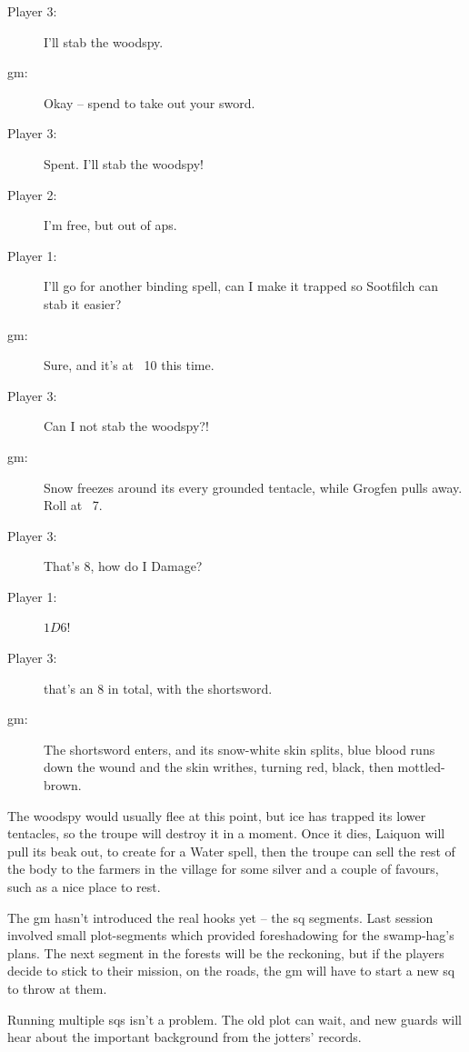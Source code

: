 \begin{multicols}{3}
\begin{description}
  \item[Player 3:]
  I'll stab the \gls{woodspy}.
  \item[\gls{gm}:]
  Okay -- spend  to take out your sword.
  \item[Player 3:]
  Spent.
  I'll stab the \gls{woodspy}!
  \item[Player 2:]
  I'm free, but out of \glspl{ap}.
  \item[Player 1:]
  I'll go for another binding spell, can I make it trapped so Sootfilch can stab it easier?
  \item[\gls{gm}:]
  Sure, and it's at ~10 this time.
  \item[Player 3:]
  Can I not stab the \gls{woodspy}?!
  \item[\gls{gm}:]
  Snow freezes around its every grounded tentacle, while Grogfen pulls away.
  Roll  at ~7.
  \item[Player 3:]
  That's 8, how do I Damage?
  \item[Player 1:]
  $1D6$!
  \item[Player 3:]
   that's an 8 in total, with the shortsword.
  \item[\gls{gm}:]
  The shortsword enters, and its snow-white skin splits, blue blood runs down the wound and the skin writhes, turning red, black, then mottled-brown.
\end{description}

\bigLine
\vspace{\baselineskip}

The \gls{woodspy} would usually flee at this point, but ice has trapped its lower tentacles, so the troupe will destroy it in a moment.
Once it dies, Laiquon will pull its beak out, to create  for a Water spell, then the troupe can sell the rest of the body to the farmers in the \gls{village} for some silver and a couple of favours, such as a nice place to rest.

The \gls{gm} hasn't introduced the real hooks yet -- the \gls{sq} \glspl{segment}.
Last session involved small plot-\glspl{segment} which provided foreshadowing for the swamp-hag's plans.
The next \gls{segment} in the forests will be the reckoning, but if the players decide to stick to their mission, on the roads, the \gls{gm} will have to start a new \gls{sq} to throw at them.

Running multiple \glspl{sq} isn't a problem.
The old plot can wait, and new \glspl{guard} will hear about the important background from the \glspl{jotter}' records.


\end{multicols}

